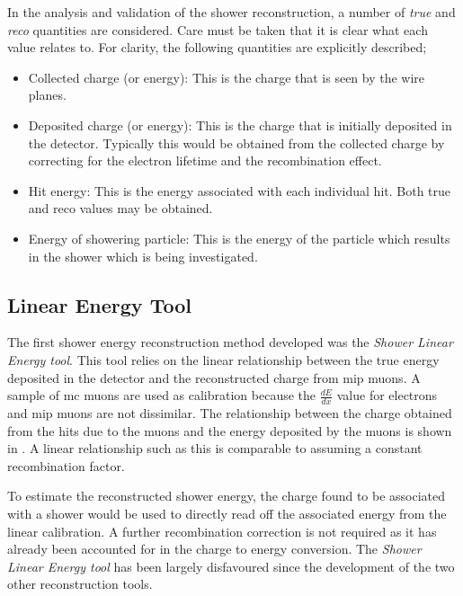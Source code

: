 In the analysis and validation of the shower reconstruction, a number of \textit{true} and \textit{reco} quantities are considered. Care must be taken that it is clear what each value relates to. For clarity, the following quantities are explicitly described;
\begin{itemize}
    \item Collected charge (or energy): This is the charge that is seen by the wire planes. 
    \item Deposited charge (or energy): This is the charge that is initially deposited in the detector. Typically this would be obtained from the collected charge by correcting for the electron lifetime and the recombination effect.
    \item Hit energy: This is the energy associated with each individual hit. Both true and reco values may be obtained.
    \item Energy of showering particle: This is the energy of the particle which results in the shower which is being investigated. 
\end{itemize}
\subsection{Linear Energy Tool}\label{subchap:Linear Energy Tool}
The first shower energy reconstruction method developed was the \textit{Shower Linear Energy tool}. This tool relies on the linear relationship between the true energy deposited in the detector and the reconstructed charge from \gls{mip} muons. A sample of \Gls{mc} muons are used as calibration because the $\frac{dE}{dx}$ value for electrons and \Gls{mip} muons are not dissimilar. The relationship between the charge obtained from the hits due to the muons and the energy deposited by the muons is shown in . A linear relationship such as this is comparable to assuming a constant recombination factor. 


To estimate the reconstructed shower energy, the charge found to be associated with a shower would be used to directly read off the associated energy from the linear calibration. A further recombination correction is not required as it has already been accounted for in the charge to energy conversion. The \textit{Shower Linear Energy tool} has been largely disfavoured since the development of the two other reconstruction tools. 


